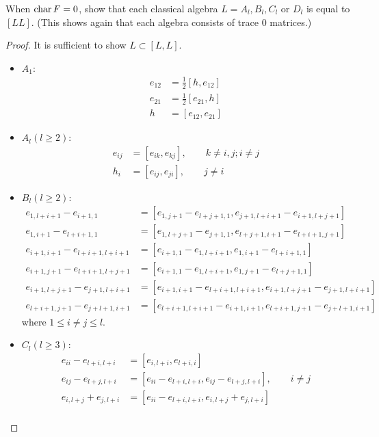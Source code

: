 \begin{ex}\label{1.9}
  When $\operatorname{char} F = 0$, show that each classical algebra $L = A_l,B_l,C_l$ or $D_l$ is equal to $[LL]$. (This shows again that each algebra consists of trace $0$ matrices.)
\end{ex}
\begin{proof}
  It is sufficient to show $L\subset[L,L]$.
  \begin{itemize}
    \item $A_1$:
    \begin{align*}
      e_{12} &= \frac{1}{2}[h,e_{12}] \\
      e_{21} &= \frac{1}{2}[e_{21},h] \\
      h &= [e_{12},e_{21}]
    \end{align*}
    \item $A_l(l\geqslant2)$:
    \begin{align*}
      e_{ij} &= [e_{ik},e_{kj}],\qquad k\neq i, j; i\neq j \\
      h_i &= [e_{ij},e_{ji}], \qquad j\neq i
    \end{align*}
    \item $B_l(l\geqslant2)$:
    \begin{align*}
      e_{1,l+i+1}-e_{i+1,1} &= [e_{1,j+1}-e_{l+j+1,1},e_{j+1,l+i+1}-e_{i+1,l+j+1}] \\
      e_{1,i+1} - e_{l+i+1,1} &= [e_{1,l+j+1} - e_{j+1,1}, e_{l+j+1,i+1} - e_{l+i+1,j+1}] \\
      e_{i+1,i+1} - e_{l+i+1,l+i+1} &= [e_{i+1,1} - e_{1,l+i+1}, e_{1,i+1} - e_{l+i+1,1}] \\
      e_{i+1,j+1} - e_{l+i+1,l+j+1} &= [e_{i+1,1} - e_{1,l+i+1}, e_{1,j+1} - e_{l+j+1,1}] \\
      e_{i+1,l+j+1} - e_{j+1,l+i+1} &= [e_{i+1,i+1} - e_{l+i+1,l+i+1}, e_{i+1,l+j+1} - e_{j+1,l+i+1}] \\
      e_{l+i+1,j+1} - e_{j+l+1,i+1} &= [e_{l+i+1,l+i+1} - e_{i+1,i+1}, e_{l+i+1,j+1} - e_{j+l+1,i+1}]
    \end{align*}
    where $1 \leqslant i \neq j \leqslant l$.
    \item $C_l(l\geqslant3)$:
    \begin{align*}
      e_{ii}-e_{l+i,l+i} &= [e_{i,l+i}, e_{l+i,i}] \\
      e_{ij} - e_{l+j,l+i} &= [e_{ii} - e_{l+i,l+i}, e_{ij} - e_{l+j,l+i}],\qquad i\neq j \\
      e_{i,l+j} + e_{j,l+i} &= [e_{ii} - e_{l+i,l+i}, e_{i,l+j} + e_{j,l+i}] \\

\end{align*}
\end{itemize}
\end{proof}
